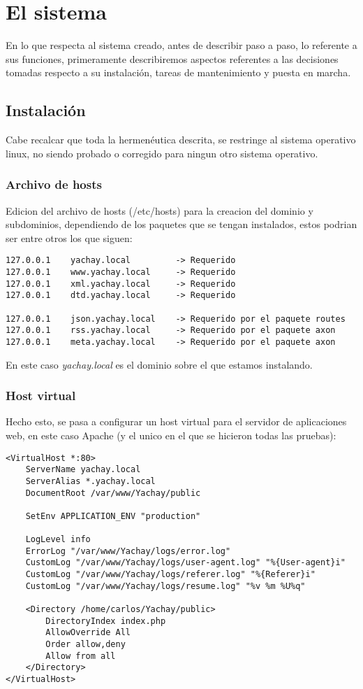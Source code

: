 \chapter{El sistema}

En lo que respecta al sistema creado, antes de describir paso a paso, lo referente a sus funciones, primeramente 
describiremos aspectos referentes a las decisiones tomadas respecto a su instalación, tareas de mantenimiento y puesta en
marcha.

\section{Instalación}
Cabe recalcar que toda la hermenéutica descrita, se restringe al sistema operativo linux, no siendo probado o
corregido para ningun otro sistema operativo.

\subsection{Archivo de hosts}
Edicion del archivo de hosts (/etc/hosts) para la creacion del dominio y subdominios, dependiendo de los paquetes que se
tengan instalados, estos podrian ser entre otros los que siguen:

\small
\begin{verbatim}
127.0.0.1    yachay.local         -> Requerido
127.0.0.1    www.yachay.local     -> Requerido
127.0.0.1    xml.yachay.local     -> Requerido
127.0.0.1    dtd.yachay.local     -> Requerido

127.0.0.1    json.yachay.local    -> Requerido por el paquete routes
127.0.0.1    rss.yachay.local     -> Requerido por el paquete axon
127.0.0.1    meta.yachay.local    -> Requerido por el paquete axon
\end{verbatim}

En este caso \emph{yachay.local} es el dominio sobre el que estamos instalando.

\subsection{Host virtual}
Hecho esto, se pasa a configurar un host virtual para el servidor de aplicaciones web, en este caso Apache (y el unico en
el que se hicieron todas las pruebas):

\small
\begin{verbatim}
<VirtualHost *:80>
    ServerName yachay.local
    ServerAlias *.yachay.local
    DocumentRoot /var/www/Yachay/public

    SetEnv APPLICATION_ENV "production"

    LogLevel info
    ErrorLog "/var/www/Yachay/logs/error.log"
    CustomLog "/var/www/Yachay/logs/user-agent.log" "%{User-agent}i"
    CustomLog "/var/www/Yachay/logs/referer.log" "%{Referer}i"
    CustomLog "/var/www/Yachay/logs/resume.log" "%v %m %U%q"

    <Directory /home/carlos/Yachay/public>
        DirectoryIndex index.php
        AllowOverride All
        Order allow,deny
        Allow from all
    </Directory>
</VirtualHost>
\end{verbatim}

